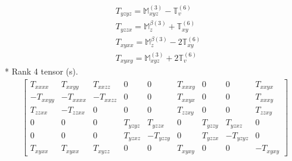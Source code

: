 \documentclass[fleqn,8pt,landscape]{jsarticle}
\begin{document}
\begin{align*}
& T_{yzyz} = \mathbb{M}_{xyz}^{(3)} - \mathbb{T}_{v}^{(6)} \\
& T_{yzzx} = \mathbb{M}_{z}^{\beta(3)} + \mathbb{T}_{xy}^{(6)} \\
& T_{xyxx} = \mathbb{M}_{z}^{\beta(3)} - 2 \mathbb{T}_{xy}^{(6)} \\
& T_{xyxy} = \mathbb{M}_{xyz}^{(3)} + 2 \mathbb{T}_{v}^{(6)}
\end{align*}
* Rank 4 tensor (s).
\begin{align*}
\begin{bmatrix} T_{xxxx} & T_{xxyy} & T_{xxzz} & 0 & 0 & T_{xxxy} & 0 & 0 & T_{xxyx} \\ - T_{xxyy} & - T_{xxxx} & - T_{xxzz} & 0 & 0 & T_{xxyx} & 0 & 0 & T_{xxxy} \\ T_{zzxx} & - T_{zzxx} & 0 & 0 & 0 & T_{zzxy} & 0 & 0 & T_{zzxy} \\ 0 & 0 & 0 & T_{yzyz} & T_{yzzx} & 0 & T_{yzzy} & T_{yzxz} & 0 \\ 0 & 0 & 0 & T_{yzxz} & - T_{yzzy} & 0 & T_{yzzx} & - T_{yzyz} & 0 \\ T_{xyxx} & T_{xyxx} & T_{xyzz} & 0 & 0 & T_{xyxy} & 0 & 0 & - T_{xyxy} \end{bmatrix}
\end{align*}
\end{document}
